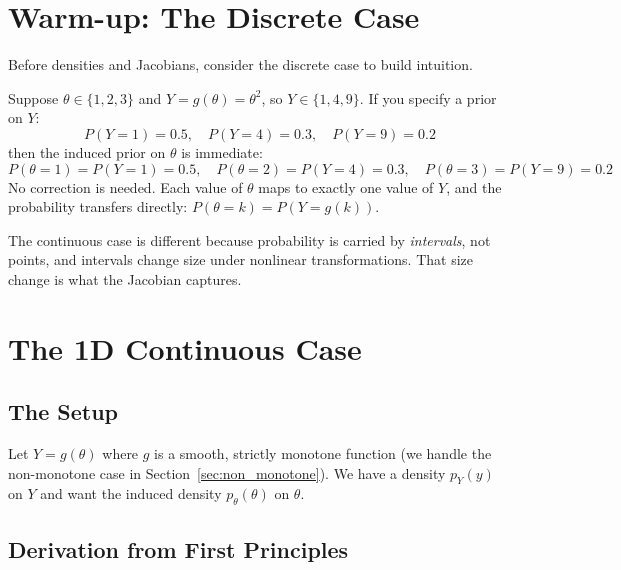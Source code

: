 \documentclass[11pt,a4paper]{article}
\theoremstyle{definition}
\begin{document}
\section{Warm-up: The Discrete Case}
\label{sec:discrete}

Before densities and Jacobians, consider the discrete case to build intuition.

Suppose $\theta \in \{1, 2, 3\}$ and $Y = g(\theta) = \theta^2$, so
$Y \in \{1, 4, 9\}$. If you specify a prior on $Y$:
\begin{equation}
    P(Y = 1) = 0.5, \quad P(Y = 4) = 0.3, \quad P(Y = 9) = 0.2
\end{equation}
then the induced prior on $\theta$ is immediate:
\begin{equation}
    P(\theta = 1) = P(Y = 1) = 0.5, \quad
    P(\theta = 2) = P(Y = 4) = 0.3, \quad
    P(\theta = 3) = P(Y = 9) = 0.2
\end{equation}
No correction is needed. Each value of $\theta$ maps to exactly one value of
$Y$, and the probability transfers directly:
$P(\theta = k) = P(Y = g(k))$.

The continuous case is different because probability is carried by
\emph{intervals}, not points, and intervals change size under nonlinear
transformations. That size change is what the Jacobian captures.


\section{The 1D Continuous Case}
\label{sec:1d}

\subsection{The Setup}

Let $Y = g(\theta)$ where $g$ is a smooth, strictly monotone function (we
handle the non-monotone case in Section~\ref{sec:non_monotone}). We have a
density $p_Y(y)$ on $Y$ and want the induced density $p_\theta(\theta)$ on
$\theta$.

\subsection{Derivation from First Principles}
\end{document}
